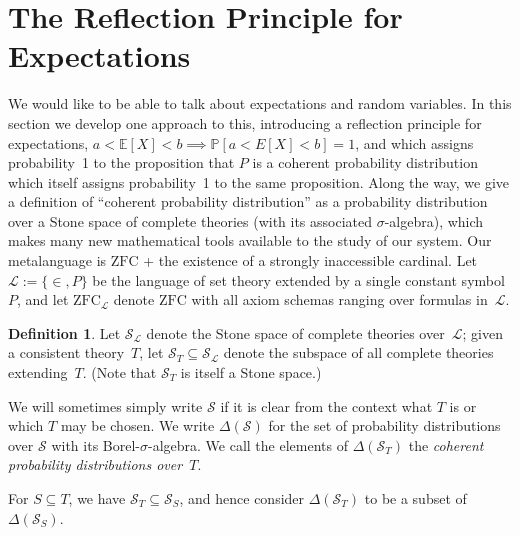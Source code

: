 \documentclass[12pt]{article}
\newcommand{\PP}{\mathbb{P}}
\newcommand{\EE}{\mathbb{E}}
\newcommand{\zfc}{\mathrm{ZFC}}
\newcommand{\zfcl}{{\zfc_\cL}}
\newcommand{\cSL}{{\cS_\cL}}
\newcommand{\cL}{\mathcal{L}}
\newcommand{\cS}{\mathcal{S}}
\theoremstyle{plain}
\theoremstyle{definition}
\newtheorem{definition}[theorem]{Definition}
\theoremstyle{remark}
\begin{document}
\section{The Reflection Principle for Expectations}
\label{refl-exp}
We would like to be able to talk about expectations and random variables. In this section we develop one approach to this, introducing a reflection principle for expectations, $a < \EE[X] < b \implies \PP[a < E[X] < b] = 1$, and which assigns probability~1 to the proposition that $P$ is a coherent probability distribution which itself assigns probability~1 to the same proposition. 
Along the way, we give a definition of ``coherent probability distribution'' as a probability distribution over a Stone space of complete theories (with its associated $\sigma$-algebra), which makes many new mathematical tools available to the study of our system.
Our metalanguage is $\zfc$ + the existence of a strongly inaccessible cardinal.
Let $\cL := \{\in,P\}$ be the language of set theory extended by a single constant symbol $P$, and let $\zfcl$ denote $\zfc$ with all axiom schemas ranging over formulas in~$\cL$.
\begin{definition}
Let $\cSL$ denote the Stone space of complete theories over~$\cL$; given a consistent theory~$T$, let $\cS_T\subseteq\cSL$ denote the subspace of all complete theories extending~$T$. (Note that $\cS_T$ is itself a Stone space.) 

We will sometimes simply write $\cS$ if it is clear from the context what $T$ is or which $T$ may be chosen.
We write $\Delta(\cS)$ for the set of probability distributions over $\cS$ with its Borel-$\sigma$-algebra. We call the elements of $\Delta(\cS_T)$ the \emph{coherent probability distributions over~$T$}.
\end{definition}
For $S\subseteq T$, we have $\cS_T\subseteq\cS_S$, and hence consider $\Delta(\cS_T)$ to be a subset of $\Delta(\cS_S)$.
\end{document}
